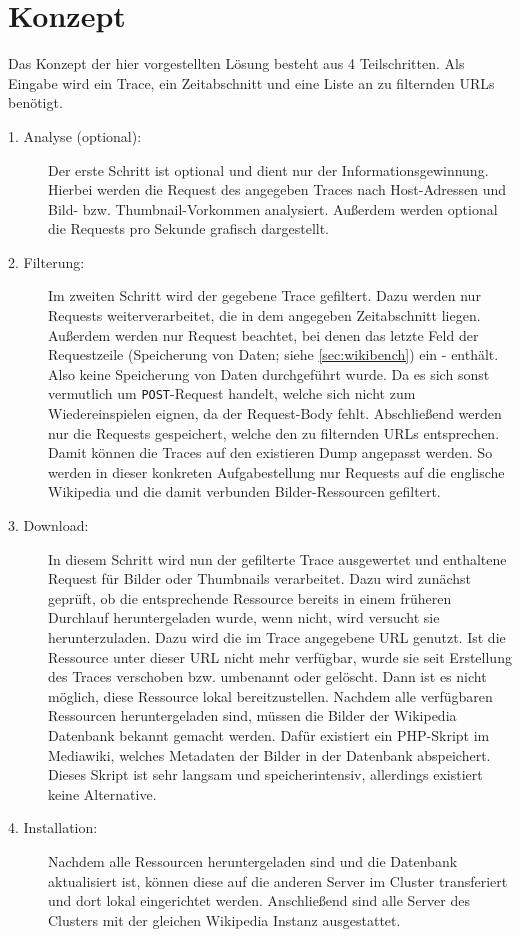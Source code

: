 \section{Konzept}
\label{sec:konzept}

Das Konzept der hier vorgestellten Lösung besteht aus 4 Teilschritten. Als Eingabe wird ein Trace, ein Zeitabschnitt und eine Liste an zu filternden URLs benötigt.

\begin{description}
\item[1. Analyse (optional):] Der erste Schritt ist optional und dient nur der Informationsgewinnung. Hierbei werden die Request des angegeben Traces nach Host-Adressen und Bild- bzw. Thumbnail-Vorkommen analysiert. Außerdem werden optional die Requests pro Sekunde grafisch dargestellt.
\item[2. Filterung:] Im zweiten Schritt wird der gegebene Trace gefiltert. Dazu werden nur Requests weiterverarbeitet, die in dem angegeben Zeitabschnitt liegen. Außerdem werden nur Request beachtet, bei denen das letzte Feld der Requestzeile (Speicherung von Daten; siehe \ref{sec:wikibench}) ein \glqq{}-\grqq{} enthält. Also keine Speicherung von Daten durchgeführt wurde. Da es sich sonst vermutlich um \texttt{POST}-Request handelt, welche sich nicht zum Wiedereinspielen eignen, da der Request-Body fehlt. Abschließend werden nur die Requests gespeichert, welche den zu filternden URLs entsprechen. Damit können die Traces auf den existieren Dump angepasst werden. So werden in dieser konkreten Aufgabestellung nur Requests auf die englische Wikipedia und die damit verbunden Bilder-Ressourcen gefiltert.
\item[3. Download:] In diesem Schritt wird nun der gefilterte Trace ausgewertet und enthaltene Request für Bilder oder Thumbnails verarbeitet. Dazu wird zunächst geprüft, ob die entsprechende Ressource bereits in einem früheren Durchlauf heruntergeladen wurde, wenn nicht, wird versucht sie herunterzuladen. Dazu wird die im Trace angegebene URL genutzt. Ist die Ressource unter dieser URL nicht mehr verfügbar, wurde sie seit Erstellung des Traces verschoben bzw. umbenannt oder gelöscht. Dann ist es nicht möglich, diese Ressource lokal bereitzustellen. Nachdem alle verfügbaren Ressourcen heruntergeladen sind, müssen die Bilder der Wikipedia Datenbank bekannt gemacht werden. Dafür existiert ein PHP-Skript im Mediawiki, welches Metadaten der Bilder in der Datenbank abspeichert. Dieses Skript ist sehr langsam und speicherintensiv, allerdings existiert keine Alternative.
\item[4. Installation:] Nachdem alle Ressourcen heruntergeladen sind und die Datenbank aktualisiert ist, können diese auf die anderen Server im Cluster transferiert und dort lokal eingerichtet werden. Anschließend sind alle Server des Clusters mit der gleichen Wikipedia Instanz ausgestattet.
\end{description}
